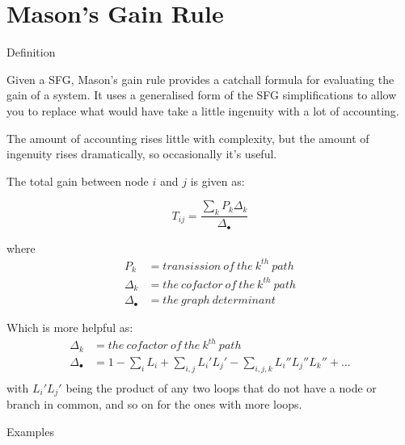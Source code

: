 \documentclass{../templates/topic}
\begin{document}
\chapter{Mason's Gain Rule}

\begin{section}{Definition}
	
	Given a SFG, Mason's gain rule provides a catchall formula for evaluating the gain of a system. It uses a generalised form of the SFG simplifications to allow you to replace what would have take a little ingenuity with a lot of accounting.
	
	The amount of accounting rises little with complexity, but the amount of ingenuity rises dramatically, so occasionally it's useful.
	
	The total gain between node $i$ and $j$ is given as:
	
	\begin{equation}
		T_{ij} = \frac{\sum_{k}P_{k}\Delta_{k}}{\Delta_{\bullet}}
	\end{equation}
	
	where
	\begin{align*}
		P_{k}&= transission\ of\ the\ k^{th}\ path \\
		\Delta_{k}&= the\ cofactor\ of\ the\ k^{th}\ path \\
		\Delta_{\bullet}&= the\ graph\ determinant\
	\end{align*}
	
	Which is more helpful as:
	\begin{align*}
		\Delta_{k}&= the\ cofactor\ of\ the\ k^{th}\ path \\
		\Delta_{\bullet}&= 1 - \sum_{i}L_i + \sum_{i,j}L_i' L_j'  - \sum_{i,j,k}L_i'' L_j''L_k'' + ... \\
	\end{align*}
	with $L_i'L_j'$ being the product of any two loops that do not have a node or branch in common, and so on for the ones with more loops.
	
\end{section}

\begin{section}{Examples}
	
	
	
\end{section}
\end{document}
